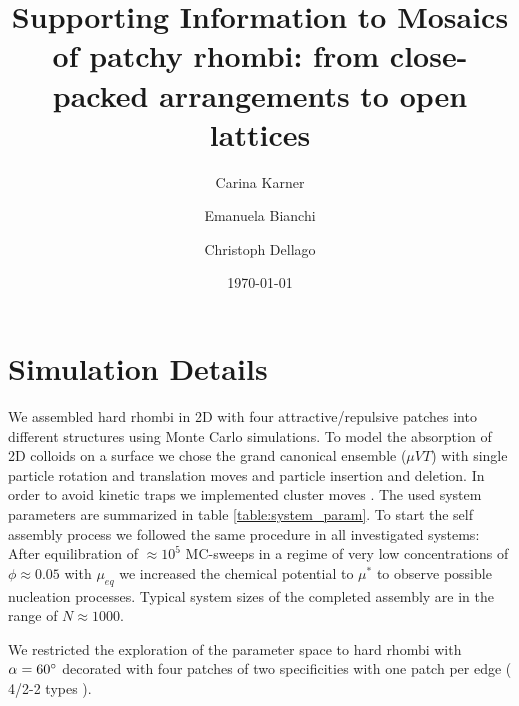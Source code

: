 \documentclass[a4paper,preprint]{revtex4}
\begin{document}
\title{Supporting Information to Mosaics of patchy rhombi: from close-packed arrangements to open lattices}

\author{Carina Karner}
\email{}

\author{Emanuela Bianchi}

\author{Christoph Dellago}
\email{}

\date{\today}

\maketitle

\section{Simulation Details} 
We assembled hard rhombi in 2D with four attractive/repulsive patches into different structures using Monte Carlo simulations. To model the absorption of 2D colloids on a surface we chose the grand canonical ensemble ($\mu VT$) with single particle rotation and translation moves and particle insertion and deletion. 
In order to avoid kinetic traps we implemented cluster moves \cite{XX}.
The used system parameters are summarized in  table \ref{table:system_param}.
To start the self assembly process we followed the same procedure in all investigated systems:
After equilibration of $\approx 10^5$ MC-sweeps in a regime of very low concentrations of $\phi\approx 0.05$ with $\mu_{eq}$ we increased the chemical potential to $\mu^{*}$ to observe possible nucleation processes.
Typical system sizes of the completed assembly are in the range of $N\approx 1000$.
 
We restricted the exploration of the parameter space to hard rhombi with $\alpha = 60 \degree$ decorated with four patches of two specificities with one patch per edge ( 4/2-2 types ).
\end{document}
